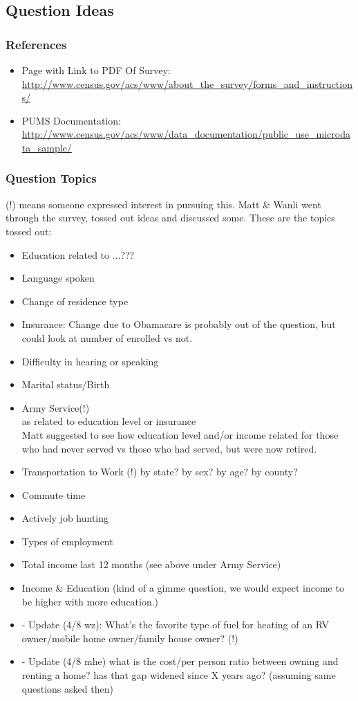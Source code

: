 \documentclass{article}
\begin{document}
\subsection{Question Ideas}
\subsubsection{References}
\begin{itemize}
\item Page with Link to PDF Of Survey: \url{http://www.census.gov/acs/www/about_the_survey/forms_and_instructions/}
\item PUMS Documentation: \url{http://www.census.gov/acs/www/data_documentation/public_use_microdata_sample/}
\end{itemize}

\subsubsection{Question Topics}
(!) means someone expressed interest in pursuing this. Matt \& Wanli went through the survey, tossed out ideas and discussed some. These are the topics tossed out:

\begin{itemize}
\item Education related to ...???
\item Language spoken
\item Change of residence type
\item Insurance: Change due to Obamacare is probably out of the question, but could look at number of enrolled vs not.
\item Difficulty in hearing or speaking
\item Marital status/Birth
\item Army Service(!)\\
  as related to education level or insurance\\
  Matt suggested to see how education level and/or income related for those who had never served vs those who had served, but were now retired.
\item Transportation to Work (!)
  by state? by sex? by age? by county? 
\item Commute time
\item Actively job hunting
\item Types of employment
\item Total income last 12 months (see above under Army Service)
\item Income \& Education (kind of a gimme question, we would expect income to be higher with more education.)
\item - Update (4/8 wz): What's the favorite type of fuel for heating of an RV owner/mobile home owner/family house owner? (!)
\item - Update (4/8 mhe) what is the cost/per person ratio between owning and renting a home? has that gap widened since X years ago? (assuming same questions asked then)
\end{itemize}
\end{document}
